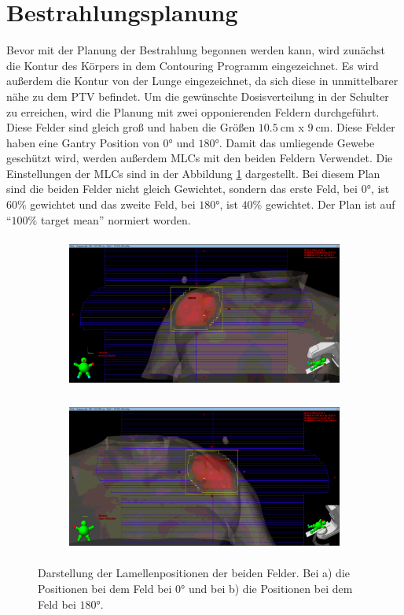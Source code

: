 \section{Bestrahlungsplanung}
\label{sec:Bestrahlungsplanung}

Bevor mit der Planung der Bestrahlung begonnen werden kann, wird zunächst die Kontur des Körpers in dem Contouring Programm eingezeichnet.
Es wird außerdem die Kontur von der Lunge eingezeichnet, da sich diese in unmittelbarer nähe zu dem PTV befindet.
Um die gewünschte Dosisverteilung in der Schulter zu erreichen, wird die Planung mit zwei opponierenden Feldern durchgeführt.
Diese Felder sind gleich groß und haben die Größen $\SI{10.5}{\centi\meter}$ x $\SI{9}{\centi\meter}$. Diese Felder haben eine Gantry Position von
$0°$ und $180°$. Damit das umliegende Gewebe geschützt wird, werden außerdem MLCs mit den beiden Feldern Verwendet. Die Einstellungen der MLCs sind
in der Abbildung \ref{abb:MLC} dargestellt. Bei diesem Plan sind die beiden Felder nicht gleich Gewichtet, sondern das erste Feld, bei $0°$, ist $60\%$
gewichtet und das zweite Feld, bei $180°$, ist $40\%$ gewichtet. Der Plan ist auf \enquote{$100\%$ target mean} normiert worden.

\begin{figure}[H]
  \centering
  \begin{subfigure}{\textwidth}
    \centering
    \includegraphics[height = 5cm]{Bilder/MLC_Schulter1.png}
    \caption{}
  \end{subfigure}
  \begin{subfigure}{\textwidth}
    \centering
    \includegraphics[height=5cm]{Bilder/MLC_Schulter2.png}
    \caption{}
  \end{subfigure}
  \caption{Darstellung der Lamellenpositionen der beiden Felder. Bei a) die Positionen bei dem Feld bei $0°$ und bei b) die Positionen bei dem Feld bei $180°$.}
  \label{abb:MLC}
\end{figure}
